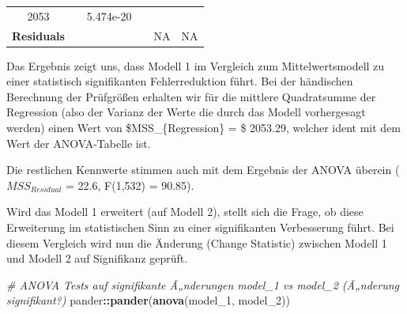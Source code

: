 \documentclass[]{article}
\newenvironment{Shaded}{\begin{snugshade}}{\end{snugshade}}
\newcommand{\CommentTok}[1]{\textcolor[rgb]{0.56,0.35,0.01}{\textit{#1}}}
\newcommand{\DecValTok}[1]{\textcolor[rgb]{0.00,0.00,0.81}{#1}}
\newcommand{\KeywordTok}[1]{\textcolor[rgb]{0.13,0.29,0.53}{\textbf{#1}}}
\newcommand{\NormalTok}[1]{#1}
\newcommand{\OperatorTok}[1]{\textcolor[rgb]{0.81,0.36,0.00}{\textbf{#1}}}
\begin{document}
\begin{longtable}[]{@{}cccccc@{}}
\begin{minipage}[t]{0.12\columnwidth}
2053\strut
\end{minipage} & \begin{minipage}[t]{0.12\columnwidth}\centering
90.85\strut
\end{minipage} & \begin{minipage}[t]{0.14\columnwidth}\centering
5.474e-20\strut
\end{minipage}\tabularnewline
\begin{minipage}[t]{0.19\columnwidth}\centering
\textbf{Residuals}\strut
\end{minipage} & \begin{minipage}[t]{0.07\columnwidth}\centering
532\strut
\end{minipage} & \begin{minipage}[t]{0.10\columnwidth}\centering
12023\strut
\end{minipage} & \begin{minipage}[t]{0.12\columnwidth}\centering
22.6\strut
\end{minipage} & \begin{minipage}[t]{0.12\columnwidth}\centering
NA\strut
\end{minipage} & \begin{minipage}[t]{0.14\columnwidth}\centering
NA\strut
\end{minipage}\tabularnewline
\bottomrule
\end{longtable}

Das Ergebnis zeigt uns, dass Modell 1 im Vergleich zum Mittelwertsmodell zu einer statistisch signifikanten Fehlerreduktion führt. Bei der händischen Berechnung der Prüfgrößen erhalten wir für die mittlere Quadratsumme der Regression (also der Varianz der Werte die durch das Modell vorhergesagt werden) einen Wert von \$MSS\_\{Regression\} = \$ 2053.29, welcher ident mit dem Wert der ANOVA-Tabelle ist.

Die restlichen Kennwerte stimmen auch mit dem Ergebnis der ANOVA überein (\(MSS_{Residual}\) = 22.6, F(1,532) = 90.85).

Wird das Modell 1 erweitert (auf Modell 2), stellt sich die Frage, ob diese Erweiterung im statistischen Sinn zu einer signifikanten Verbesserung führt. Bei diesem Vergleich wird nun die Änderung (Change Statistic) zwischen Modell 1 und Modell 2 auf Signifikanz geprüft.

\begin{Shaded}
\begin{Highlighting}[]
  \CommentTok{# ANOVA Tests auf signifikante Ã„nderungen model_1 vs model_2 (Ã„nderung signifikant?)}
\NormalTok{  pander}\OperatorTok{::}\KeywordTok{pander}\NormalTok{(}\KeywordTok{anova}\NormalTok{(model_}\DecValTok{1}\NormalTok{, model_}\DecValTok{2}\NormalTok{))}
\end{Highlighting}
\end{Shaded}
\end{document}
